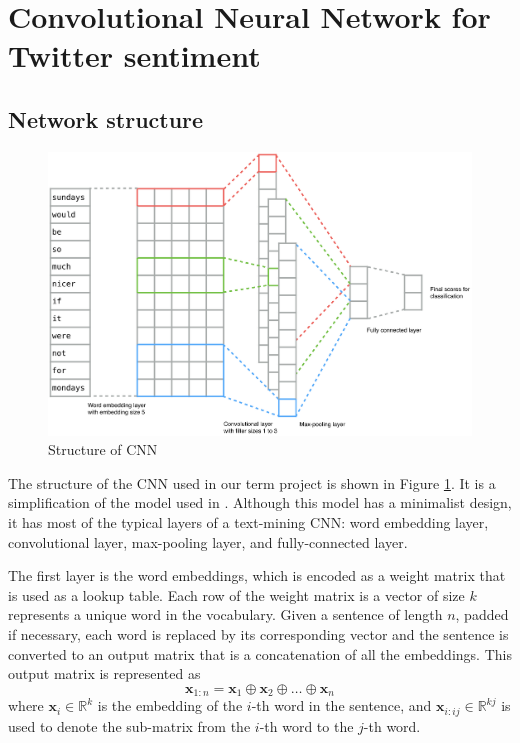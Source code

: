 \section{Convolutional Neural Network for Twitter sentiment}

\subsection{Network structure}

\begin{figure}[htb]
\centering
  \includegraphics[width=0.8\linewidth]{figure/cnn.png}
  \caption{Structure of CNN}\label{fig.cnn}
\end{figure}

The structure of the CNN used in our term project is shown in Figure \ref{fig.cnn}. It is a simplification of the model used in \cite{kim2014}. Although this model has a minimalist design, it has most of the typical layers of a text-mining CNN: word embedding layer, convolutional layer, max-pooling layer, and fully-connected layer.

The first layer is the word embeddings, which is encoded as a weight matrix that is used as a lookup table. Each row of the weight matrix is a vector of size $k$ represents a unique word in the vocabulary. Given a sentence of length $n$, padded if necessary, each word is replaced by its corresponding vector and the sentence is converted to an output matrix that is a concatenation of all the embeddings. This output matrix is represented as
$$
\textbf{x}_{1:n} = \textbf{x}_1 \oplus \textbf{x}_2 \oplus \ldots \oplus \textbf{x}_n
$$
where $\textbf{x}_i \in \mathbb{R}^k$ is the embedding of the $i$-th word in the sentence, and $\textbf{x}_{i:ij} \in \mathbb{R}^{kj}$ is used to denote the sub-matrix from the $i$-th word to the $j$-th word.

